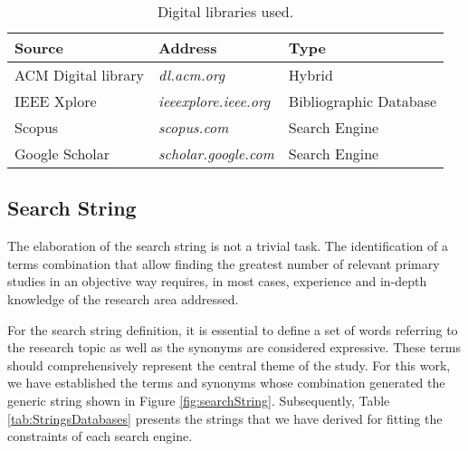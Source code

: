 \begin{table}[!ht]
    \centering
    \scriptsize
    \caption{Digital libraries used.}
    \label{tab:reserchSources}
    \begin{tabular}{m{4cm}m{4cm}m{4cm}}
    \bottomrule
    \rowcolor[HTML]{C0C0C0}
    \textbf{Source} & \textbf{Address} & \textbf{Type} \\ 
    \hline
    ACM Digital library & \textit{dl.acm.org}           & Hybrid\\
    IEEE Xplore         & \textit{ieeexplore.ieee.org}  & Bibliographic Database \\ 
    Scopus       & \textit{scopus.com}   & Search Engine \\
    Google Scholar        & \textit{scholar.google.com}    & Search Engine \\ 
    \toprule
    \end{tabular}
\end{table}

\subsection{Search String} \label{ssec_slm:searchString}

The elaboration of the search string is not a trivial task.
The identification of a terms combination that allow finding the greatest number of relevant primary studies in an objective way requires, in most cases, experience and in-depth knowledge of the research area addressed.

For the search string definition, it is essential to define a set of words referring to the research topic as well as the synonyms are considered expressive. 
These terms should comprehensively represent the central theme of the study. 
For this work, we have established the terms and synonyms whose combination generated the generic string shown in Figure \ref{fig:searchString}. 
Subsequently, Table \ref{tab:StringsDatabases} presents the strings that we have derived for fitting the constraints of each search engine. 


